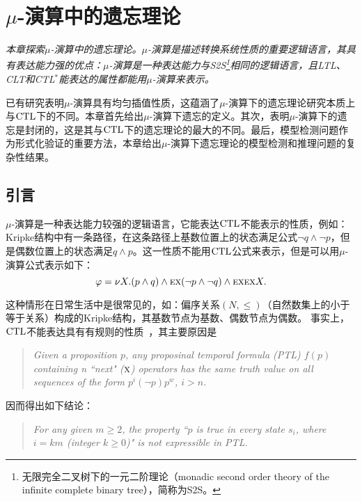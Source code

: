 \chapter{$\mu$-演算中的遗忘理论}
\label{chapter06}

{\em 本章探索$\mu$-演算中的遗忘理论。$\mu$-演算是描述转换系统性质的重要逻辑语言，其具有表达能力强的优点：$\mu$-演算是一种表达能力与S2S\footnote{无限完全二叉树下的一元二阶理论（monadic second order theory of the infinite complete binary tree），简称为S2S。}相同的逻辑语言，且LTL、CLT和CTL$^*$能表达的属性都能用$\mu$-演算来表示。
	
	已有研究表明$\mu$-演算具有均匀插值性质，这蕴涵了$\mu$-演算下的遗忘理论研究本质上与$\textrm{CTL}$下的不同。本章首先给出$\mu$-演算下遗忘的定义。其次，表明$\mu$-演算下的遗忘是封闭的，这是其与$\textrm{CTL}$下的遗忘理论的最大的不同。最后，模型检测问题作为形式化验证的重要方法，本章给出$\mu$-演算下遗忘理论的模型检测和推理问题的复杂性结果。
	}

\section{引言}
$\mu$-演算是一种表达能力较强的逻辑语言，它能表达$\textrm{CTL}$不能表示的性质，例如：Kripke结构中有一条路径，在这条路径上基数位置上的状态满足公式$\neg q \wedge \neg p$，但是偶数位置上的状态满足$q \wedge p$。这一性质不能用$\textrm{CTL}$公式来表示，但是可以用$\mu$-演算公式表示如下：
$$\varphi = \nu X.(p \wedge q) \wedge \textsc{e} \textsc{x}(\neg p \wedge \neg q) \wedge \textsc{e} \textsc{x} \textsc{e} \textsc{x} X.$$

这种情形在日常生活中是很常见的，如：偏序关系$(N, \leq)$（自然数集上的小于等于关系）构成的Kripke结构，其基数节点为基数、偶数节点为偶数。
事实上，$\textrm{CTL}$不能表达具有有规则的性质~\cite{DBLP:journals/iandc/Wolper83}，其主要原因是
\begin{quote}
	\emph{Given a proposition $p$, any proposinal temporal formula (PTL) $f(p)$ containing 
	n ``next" ($\textsc{x}$) operators has the same truth value on all sequences of the form 
	$p^i(\neg p) p^w$, $i > n$.}
\end{quote}

因而得出如下结论：
\begin{quote}
	\emph{For any given $m\geq 2$, the property ``$p$ is true in every 
	state $s_i$, where $i = km$ (integer $k\geq 0$)" is not expressible in PTL.}
\end{quote}




